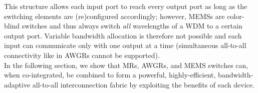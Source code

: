 This structure allows each input port to reach every output port as long as the switching elements are (re)configured accordingly; however, MEMSs are color-blind switches and thus always switch \textit{all} wavelengths of a WDM to a certain output port. Variable bandwidth allocation is therefore not possible and each input can communicate only with one output at a time (simultaneous all-to-all connectivity like in AWGRs cannot be supported).  \\
In the following section, we show that MRs, AWGRs, and MEMS switches can, when co-integrated, be combined to form a powerful, highly-efficient, bandwidth-adaptive all-to-all interconnection fabric by exploiting the benefits of each device. 




